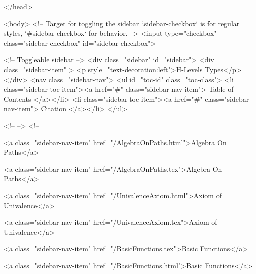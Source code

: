   
</head>




  <body>
    <!-- Target for toggling the sidebar `.sidebar-checkbox` is for regular
     styles, `#sidebar-checkbox` for behavior. -->
<input type="checkbox" class="sidebar-checkbox" id="sidebar-checkbox">

<!-- Toggleable sidebar -->
<div class="sidebar" id="sidebar">
  <div class="sidebar-item" >
    <p style="text-decoration:left">H-Levels Types</p>
  </div>
  <nav class="sidebar-nav">
    <ul id="toc-id" class="toc-class">
  <li class="sidebar-toc-item"><a href="#" class="sidebar-nav-item"> Table of Contents </a></li>
  <li class="sidebar-toc-item"><a href="#" class="sidebar-nav-item"> Citation </a></li>
</ul>


    <!--  -->
    <!-- 
      
    
      
    
      
    
      
        
      
    
      
        
          <a class="sidebar-nav-item" href="/AlgebraOnPaths.html">Algebra On Paths</a>
        
      
    
      
        
          <a class="sidebar-nav-item" href="/AlgebraOnPaths.tex">Algebra On Paths</a>
        
      
    
      
        
          <a class="sidebar-nav-item" href="/UnivalenceAxiom.html">Axiom of Univalence</a>
        
      
    
      
        
          <a class="sidebar-nav-item" href="/UnivalenceAxiom.tex">Axiom of Univalence</a>
        
      
    
      
        
          <a class="sidebar-nav-item" href="/BasicFunctions.tex">Basic Functions</a>
        
      
    
      
        
          <a class="sidebar-nav-item" href="/BasicFunctions.html">Basic Functions</a>
        
      
    
      
        
